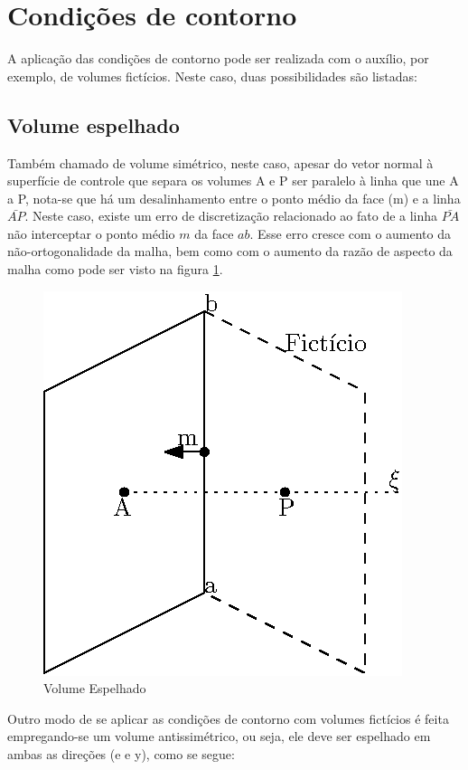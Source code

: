 \section{Condições de contorno}
A aplicação das condições de contorno pode ser realizada com o auxílio, por exemplo, de volumes fictícios. Neste caso, duas possibilidades são listadas:

\subsection{Volume espelhado}

Também chamado de volume simétrico, neste caso, apesar do vetor normal à superfície de controle que separa os volumes A e P ser paralelo à linha que une A a P, nota-se que há um desalinhamento entre o ponto médio da face (m) e a linha $\bar{AP}$. Neste caso, existe um erro de discretização relacionado ao fato de a linha $\bar{PA}$ não interceptar o ponto médio $m$ da face $ab$. Esse erro cresce com o aumento da não-ortogonalidade da malha, bem como com o aumento da razão de aspecto da malha como pode ser visto na figura \ref{contorno-1}.

\begin{figure}[h]
    \centering
    \includegraphics{fig/contorno-1.eps}
    \caption{Volume Espelhado}
    \label{contorno-1}
\end{figure}

Outro modo de se aplicar as condições de contorno com volumes fictícios é feita empregando-se um volume antissimétrico, ou seja, ele deve ser espelhado em ambas as direções (e e y), como se segue:

